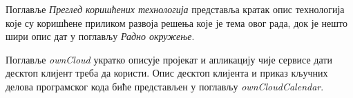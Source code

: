 Поглавље \textit{Преглед коришћених технологија} представља кратак опис технологија које су коришћене приликом развоја решења које је тема овог рада, док је нешто шири опис дат у поглављу \textit{Радно окружење}.

Поглавље \textit{ownCloud} укратко описује пројекат и апликацију чије сервисе дати десктоп клијент треба да користи. Опис десктоп клијента и приказ кључних делова програмског кода биће представљен у поглављу \textit{ownCloudCalendar}. 